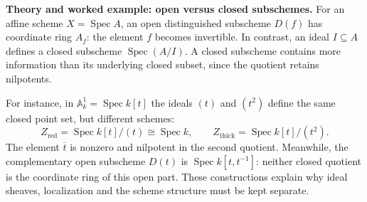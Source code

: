 \noindent\textbf{Theory and worked example: open versus closed subschemes.}
For an affine scheme $X=\operatorname{Spec}A$, an open distinguished subscheme
$D(f)$ has coordinate ring $A_f$: the element $f$ becomes invertible. In
contrast, an ideal $I\subseteq A$ defines a closed subscheme
$\operatorname{Spec}(A/I)$. A closed subscheme contains more information than
its underlying closed subset, since the quotient retains nilpotents.

For instance, in $\mathbb A^1_k=\operatorname{Spec}k[t]$ the ideals $(t)$
and $(t^2)$ define the same closed point set, but different schemes:
\[
Z_{\mathrm{red}}=\operatorname{Spec}k[t]/(t)
\cong\operatorname{Spec}k,
\qquad
Z_{\mathrm{thick}}=\operatorname{Spec}k[t]/(t^2).
\]
The element $\overline t$ is nonzero and nilpotent in the second quotient.
Meanwhile, the complementary open subscheme $D(t)$ is
$\operatorname{Spec}k[t,t^{-1}]$: neither closed quotient is the coordinate
ring of this open part. These constructions explain why ideal sheaves,
localization and the scheme structure must be kept separate.

\medskip

